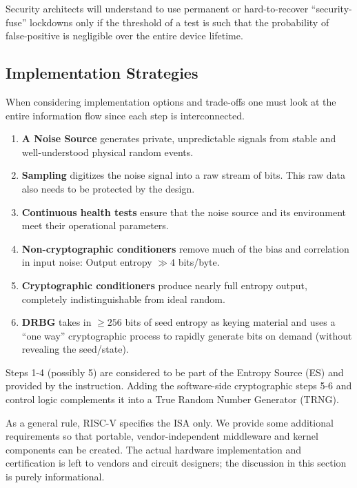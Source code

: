     Security architects will understand to use
    permanent or hard-to-recover ``security-fuse'' lockdowns only if the
    threshold of a test is such that the probability of false-positive is
    negligible over the entire device lifetime.


\subsection{Implementation Strategies}

    When considering implementation options and trade-offs one must look
    at the entire information flow since each step is interconnected.

    \begin{enumerate}
    \item   {\bf A Noise Source} generates private, unpredictable signals
            from stable and well-understood physical random events.
    \item   {\bf Sampling} digitizes the noise signal into a raw stream of
            bits. This raw data also needs to be protected by the design.
    \item   {\bf Continuous health tests} ensure that the noise source
            and its environment meet their operational parameters.
    \item   {\bf Non-cryptographic conditioners} remove much of the bias
            and correlation in input noise: Output entropy $\gg 4$ bits/byte.
    \item   {\bf Cryptographic conditioners} produce nearly full entropy
            output, completely indistinguishable from ideal random.
    \item   {\bf DRBG} takes in $\geq 256$ bits of seed entropy as keying
            material and uses a ``one way'' cryptographic process to rapidly
            generate bits on demand (without revealing the seed/state).
    \end{enumerate}
    Steps 1-4 (possibly 5) are considered to be part of the Entropy
    Source (ES) and provided by the  instruction.
    Adding the software-side cryptographic steps 5-6 and control logic
    complements it into a True Random Number Generator (TRNG).

    As a general rule, RISC-V specifies the ISA only. We provide some
    additional requirements so that portable, vendor-independent middleware
    and kernel components can be created. The actual hardware
    implementation and certification is left to vendors and circuit designers;
    the discussion in this section is purely informational.

